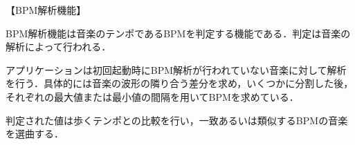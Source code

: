 【BPM解析機能】
\par
BPM解析機能は音楽のテンポであるBPMを判定する機能である．判定は音楽の解析によって行われる．
\par アプリケーションは初回起動時にBPM解析が行われていない音楽に対して解析を行う．具体的には音楽の波形の隣り合う差分を求め，いくつかに分割した後，それぞれの最大値または最小値の間隔を用いてBPMを求めている．
\par 判定された値は歩くテンポとの比較を行い，一致あるいは類似するBPMの音楽を選曲する．
